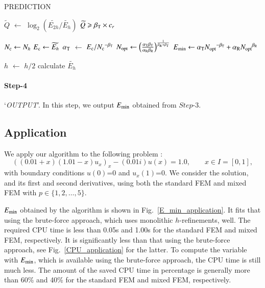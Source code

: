 \documentclass[review,3p]{elsarticle}
\begin{document}
\vspace{0.2cm}
\begin{algorithm}[H]
\caption{PREDICTION}
\label{block_PREDICTION}
    {
        $\widetilde{Q}$ $\gets$ $\log _2 \left( {\widetilde {E_{2h}}}/{\widetilde {E_{h}}} \right)$\;
        \eIf
        {
            $\widetilde{Q} \geqslant \beta_{\rm T} \times c_r$
        }
        {
            $N_{\rm c} \gets N_h$\;
            $E_{\rm c} \gets \widetilde {E_{h}}$\;
            $\alpha_{\rm T}$ $\gets$ ${E_{\rm c}}/{N_{\rm c}}^{- \beta_{\rm T}}$\;
            $N_{\rm opt} \gets \left( \frac{\alpha_{\rm T} \beta_{\rm T}}{\alpha _{\rm R} \beta_{\rm R}} \right)^{\frac{1}{\beta_{\rm R} + \beta_{\rm T}}}$\;
            $E_{\rm min} \gets \alpha_{\rm T} {N_{\rm opt}}^{- {\beta _{\rm T}}} + \alpha_{\rm R} {N_{\rm opt}}^{{\beta _{\rm R}}}$\;

        }
        {
            $h$ $\gets$ $h/2$\;
            calculate $\widetilde {E_{h}}$\;
        }
	}    
\end{algorithm}

\paragraph{Step-4} `\textit{OUTPUT}'. In this step, we output $E_{\rm min}$ obtained from $Step$-3.

\subsection{Application}		\label{section_application}

We apply our algorithm to the following problem \citep{chernetsky2010effect}:
\begin{equation}
  \left((0.01+x)(1.01-x) u_x \right)_x -(0.01i) u(x) = 1.0,\qquad x \in I = [0,1],	\label{1D_Helmholtz_equation_application}
\end{equation}
with boundary conditions $u(0)$=0 and $u_x(1)$=0. We consider the solution, and its first and second derivatives, using both the standard FEM and mixed FEM with $p \in \{1, 2, \ldots, 5\}$.

$E_{\rm min}$ obtained by the algorithm is shown in Fig.~\ref{E_min_application}. It fits that using the brute-force approach, which uses monolithic $h$-refinements, well. The required CPU time is less than 0.05s and 1.00s for the standard FEM and mixed FEM, respectively. It is significantly less than that using the brute-force approach, see Fig.~\ref{CPU_application} for the latter. To compute the variable with $E_{\rm min}$, which is available using the brute-force approach, the CPU time is still much less. The amount of the saved CPU time in percentage is generally more than 60\% and 40\% for the standard FEM and mixed FEM, respectively.
\end{document}

